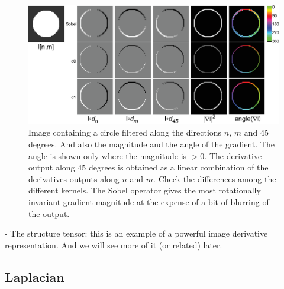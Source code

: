 \begin{figure}
	\centerline{
		\includegraphics[width=1\linewidth]{figures/spatial_filters/circle.eps}}
	\caption{Image containing a circle filtered along the directions $n$, $m$ and 45 degrees. And also the magnitude and the angle of the gradient. The angle is shown only where the magnitude is $>0$. The derivative output along 45 degrees is obtained as a linear combination of the derivatives outputs along $n$ and $m$. Check the differences among the different kernels. The Sobel operator gives the most rotationally invariant gradient magnitude at the expense of a bit of blurring of the output.}
	\label{fig:circle}
\end{figure}



- The structure tensor: this is an example of a powerful image derivative representation. And we will see more of it (or related) later.


\subsection{Laplacian}


